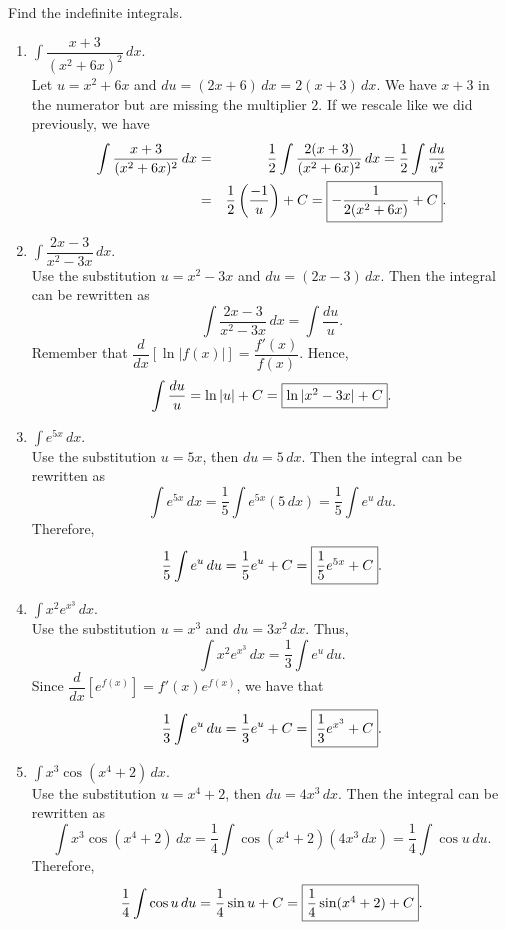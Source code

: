 \documentclass{book}
\newcommand{\dx}{\,dx}
\newcommand{\du}{\,du}
\newcommand{\dint}{\displaystyle \int}
\begin{document}
\begin{Exam} Find the indefinite integrals.
\begin{enumerate}
\item $\dint \dfrac{x+3}{(x^2+6x)^2}\dx$.\\

Let $u = x^2+6x$ and $du= (2x + 6)\dx = 2(x+3)\dx$. We have $x+3$ in the numerator but are missing the multiplier $2$. If we rescale like we did previously, we have 
\begin{eqnarray*}
 \int \dfrac{x+3}{(x^2+6x)^2}\dx &=& \dfrac{1}{2}\int \dfrac{2(x+3)}{(x^2+6x)^2}\dx = \dfrac{1}{2}\int \dfrac{du}{u^2}\\
&=& \dfrac{1}{2}\left(\dfrac{-1}{u}\right) + C = \fbox{$-\dfrac{1}{2(x^2+6x)} + C$}.
\end{eqnarray*}

\item $\dint \dfrac{2x-3}{x^2-3x}\dx $. \\

Use the substitution $u = x^2-3x$ and $du = (2x-3)\dx$. Then the integral can be rewritten as \[\int  \dfrac{2x-3}{x^2-3x}\dx = \int \dfrac{du}{u}.\] Remember that $\dfrac{d}{dx}[\ln|f(x)|] = \dfrac{f'(x)}{f(x)}$. Hence, \[\int \dfrac{du}{u} = \ln|u| + C = \fbox{$\ln|x^2-3x| + C$}.\]

\item $\dint e^{5x}\dx$.\\

Use the substitution $u = 5x$, then $du = 5\dx$. Then the integral can be rewritten as \[\int e^{5x}\dx = \dfrac{1}{5}\int e^{5x}(5\dx) = \dfrac{1}{5}\int e^u\du.\] Therefore, \[\dfrac{1}{5} \int e^u\du = \dfrac{1}{5}e^u + C = \fbox{$\dfrac{1}{5}e^{5x} + C$}.\]

\item $\dint x^2e^{x^3}\dx$.\\

Use the substitution $u = x^3$ and $du = 3x^2\dx$. Thus, \[\int x^2e^{x^3}\dx = \dfrac{1}{3} \int e^u\du.\] Since $\dfrac{d}{dx}[e^{f(x)}] = f'(x)e^{f(x)}$, we have that \[\dfrac{1}{3}\int e^u\du = \dfrac{1}{3}e^u + C = \fbox{$\dfrac{1}{3}e^{x^3} + C$}.\]

\item $\dint x^3\cos(x^4+2)\dx$. \\

Use the substitution $u = x^4+2$, then $du = 4x^3\dx$. Then the integral can be rewritten as \[\int x^3\cos(x^4+2)\dx = \dfrac{1}{4}\int \cos(x^4+2)(4x^3\dx) = \dfrac{1}{4}\int \cos u\du.\] Therefore, \[\dfrac{1}{4} \int \cos u\du = \dfrac{1}{4}\sin u + C = \fbox{$\dfrac{1}{4}\sin(x^4+2) + C$}. \]
\end{enumerate}
\end{Exam}
\end{document}
